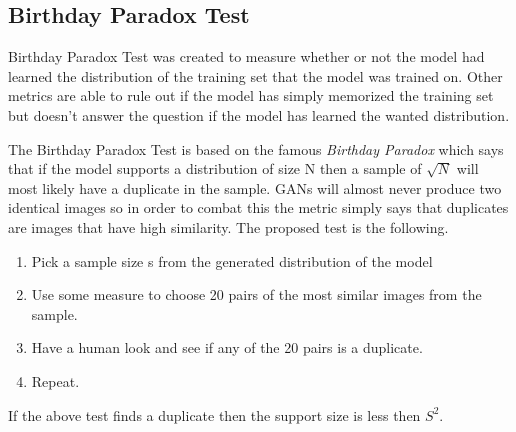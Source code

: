 \subsection{Birthday Paradox Test}
\label{sub:Birthday Paradox Test}

\begin{comment}
Probably needs a little more work.
Birthday Paradox Test \cite{arora2018gans} was created to measure whether or not the model had learned the distribution of the training set that the model was trained on. Other metrics are able to rule out if the model has simply memorized the training set but don't answer the question if the model has learned the wanted distribution. 

run the model to generate distribution(or images I think)
(a) Pick a sample Size s 
(b) The Birthday Paradox Text (BPT) looks at the closest(closest by similarity) 20 pairs.
(c) Visually inspect the 20 pairs to see if you be classified as duplicates by humans. (I think in the actual metric)
(d) Repeat a -c
If test says size s has duplicates with reasonable probability then the model has a support space size of s**2
Need A human to see if the pairs are in fact similiar?
Each dataset might need a different Heurstic Similarity Measure 
Doesn't work well with blurry images AKA won't work with gans that don't make sharp, realistic images.
\end{comment}

Birthday Paradox Test \cite{arora2018gans} was created to measure whether or not the model had learned the distribution of the training set that the model was trained on.
Other metrics are able to rule out if the model has simply memorized the training set but doesn't answer the question if the model has learned the wanted distribution.

The Birthday Paradox Test is based on the famous \textit{Birthday Paradox} which says that if the model supports a distribution of size N then a sample of $\sqrt{N}$ will most likely have a duplicate in the sample. GANs will almost never produce two identical images so in order to combat this the metric simply says that duplicates are images that have high similarity. The proposed test is the following.
\begin{enumerate}
    \item Pick a sample size s from the generated distribution of the model
    \item Use some measure to choose 20 pairs of the most similar images from the sample.
    \item Have a human look and see if any of the 20 pairs is a duplicate.
    \item Repeat.
\end{enumerate}
If the above test finds a duplicate then the support size is less then $S^2$.

